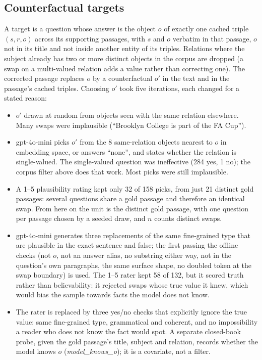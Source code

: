 \subsection{Counterfactual targets}\label{sec:targets}
A target is a question whose answer is the object $o$ of exactly one cached triple $(s, r, o)$ across its supporting
passages, with $s$ and $o$ verbatim in that passage, $o$ not in its title and not inside another entity of its triples.
Relations where the subject already has two or more distinct objects in the corpus are dropped (a swap on a
multi-valued relation adds a value rather than correcting one). The corrected passage replaces $o$ by a counterfactual
$o'$ in the text and in the passage's cached triples. Choosing $o'$ took five iterations, each changed for a stated
reason:
\begin{itemize}
\item[v1] $o'$ drawn at random from objects seen with the same relation elsewhere. Many swaps were implausible
(``Brooklyn College is part of the FA Cup'').
\item[v2] gpt-4o-mini picks $o'$ from the 8 same-relation objects nearest to $o$ in embedding space, or answers
``none'', and states whether the relation is single-valued. The single-valued question was ineffective (284 yes, 1
no); the corpus filter above does that work. Most picks were still implausible.
\item[v3] A 1--5 plausibility rating kept only 32 of 158 picks, from just 21 distinct gold passages: several questions
share a gold passage and therefore an identical swap. From here on the unit is the distinct gold passage, with one
question per passage chosen by a seeded draw, and $n$ counts distinct swaps.
\item[v4] gpt-4o-mini generates three replacements of the same fine-grained type that are plausible in the exact
sentence and false; the first passing the offline checks (not $o$, not an answer alias, no substring either way, not in
the question's own paragraphs, the same surface shape, no doubled token at the swap boundary) is used. The 1--5 rater
kept 58 of 132, but it scored truth rather than believability: it rejected swaps whose true value it knew, which would
bias the sample towards facts the model does not know.
\item[v5] The rater is replaced by three yes/no checks that explicitly ignore the true value: same fine-grained type,
grammatical and coherent, and no impossibility a reader who does not know the fact would spot. A separate closed-book
probe, given the gold passage's title, subject and relation, records whether the model knows $o$
(\emph{model\_knows\_o}); it is a covariate, not a filter.
\end{itemize}

